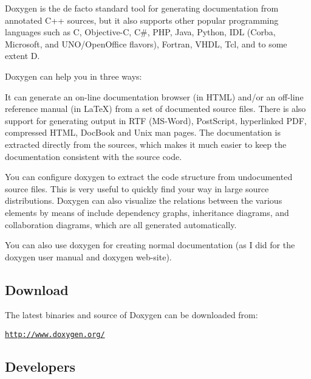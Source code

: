 Doxygen is the de facto standard tool for generating documentation from annotated C++ sources, but it also supports other popular programming languages such as C, Objective-\/C, C\#, P\+HP, Java, Python, I\+DL (Corba, Microsoft, and U\+N\+O/\+Open\+Office flavors), Fortran, V\+H\+DL, Tcl, and to some extent D.

Doxygen can help you in three ways\+:


\begin{DoxyEnumerate}
\item It can generate an on-\/line documentation browser (in H\+T\+ML) and/or an off-\/line reference manual (in La\+TeX) from a set of documented source files. There is also support for generating output in R\+TF (M\+S-\/\+Word), Post\+Script, hyperlinked P\+DF, compressed H\+T\+ML, Doc\+Book and Unix man pages. The documentation is extracted directly from the sources, which makes it much easier to keep the documentation consistent with the source code.
\item You can configure doxygen to extract the code structure from undocumented source files. This is very useful to quickly find your way in large source distributions. Doxygen can also visualize the relations between the various elements by means of include dependency graphs, inheritance diagrams, and collaboration diagrams, which are all generated automatically.
\item You can also use doxygen for creating normal documentation (as I did for the doxygen user manual and doxygen web-\/site).
\end{DoxyEnumerate}

\subsection*{Download }

The latest binaries and source of Doxygen can be downloaded from\+:
\begin{DoxyItemize}
\item \href{http://www.doxygen.org/}{\tt http\+://www.\+doxygen.\+org/}
\end{DoxyItemize}

\subsection*{Developers }


